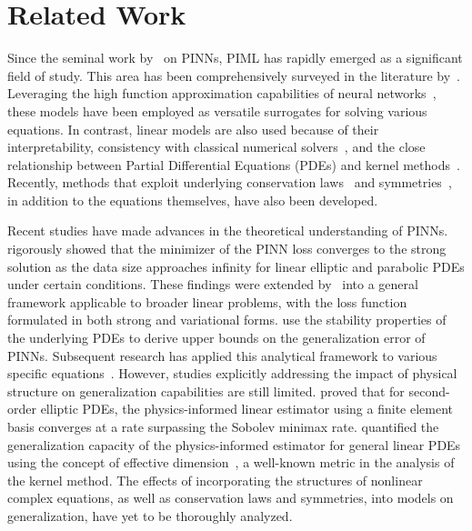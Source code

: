 \documentclass{article}
\theoremstyle{plain}
\theoremstyle{definition}
\theoremstyle{remark}
\begin{document}
\section{Related Work}
Since the seminal work by~\citet{raissi2019physics} on PINNs, PIML has rapidly emerged as a significant field of study. This area has been comprehensively surveyed in the literature by~\citep{rai2020driven,karniadakis2021physics,cuomo2022scientific,hao2022physics}. Leveraging the high function approximation capabilities of neural networks~\citep{hornik1989multilayer,kutyniok2022theoretical,de2022error}, these models have been employed as versatile surrogates for solving various equations. In contrast, linear models are also used because of their interpretability, consistency with classical numerical solvers~\citep{arnone2022some,ferraccioli2022some}, and the close relationship between Partial Differential Equations (PDEs) and kernel methods~\citep{schaback2006kernel,chen2021solving,long2022autoip,dalton2024physics,doumeche2024physics2}. Recently, methods that exploit underlying conservation laws~\citep{jagtap2020conservative,hu2022extended} and symmetries~\citep{akhound2024lie,dalton2024physics}, in addition to the equations themselves, have also been developed.

Recent studies have made advances in the theoretical understanding of PINNs. \citet{shin2020convergence} rigorously showed that the minimizer of the PINN loss converges to the strong solution as the data size approaches infinity for linear elliptic and parabolic PDEs under certain conditions. These findings were extended by~\citet{shin2023error} into a general framework applicable to broader linear problems, with the loss function formulated in both strong and variational forms. \citet{mishra2022estimates,mishra2023estimates} use the stability properties of the underlying PDEs to derive upper bounds on the generalization error of PINNs. Subsequent research has applied this analytical framework to various specific equations~\citep{bai2021physics,mishra2021physics}. However, studies explicitly addressing the impact of physical structure on generalization capabilities are still limited. \citet{arnone2022some} proved that for second-order elliptic PDEs, the physics-informed linear estimator using a finite element basis converges at a rate surpassing the Sobolev minimax rate. \citet{doumeche2024physics} quantified the generalization capacity of the physics-informed estimator for general linear PDEs using the concept of effective dimension~\citep{caponnetto2007optimal}, a well-known metric in the analysis of the kernel method. The effects of incorporating the structures of nonlinear complex equations, as well as conservation laws and symmetries, into models on generalization, have yet to be thoroughly analyzed.
\end{document}
